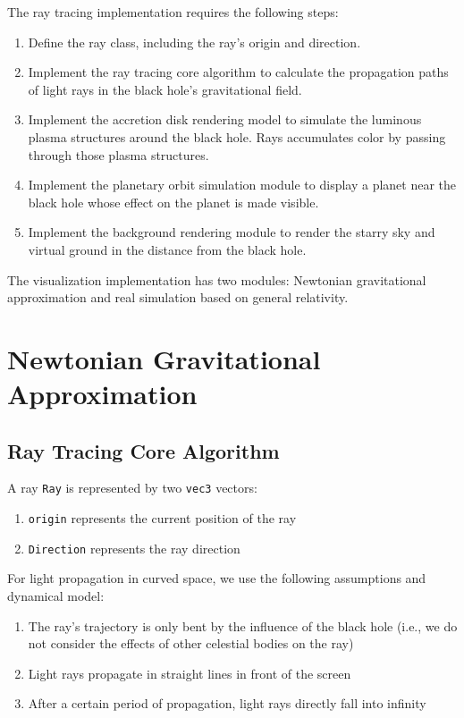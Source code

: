 \documentclass[11pt,a4paper]{article}
\begin{document}
The ray tracing implementation requires the following steps:
\begin{enumerate}
    \item Define the ray class, including the ray's origin and direction.
    \item Implement the ray tracing core algorithm to calculate the propagation paths of light rays in the black hole's gravitational field.
    \item Implement the accretion disk rendering model to simulate the luminous plasma structures around the black hole. Rays accumulates color by passing through those plasma structures.
    \item Implement the planetary orbit simulation module to display a planet near the black hole whose effect on the planet is made visible.
    \item Implement the background rendering module to render the starry sky and virtual ground in the distance from the black hole.
\end{enumerate}

The visualization implementation has two modules: Newtonian gravitational approximation and real simulation based on general relativity.

\section{Newtonian Gravitational Approximation}

\subsection{Ray Tracing Core Algorithm}

A ray \texttt{Ray} is represented by two \texttt{vec3} vectors:

\begin{enumerate}
    \item \texttt{origin} represents the current position of the ray
    \item \texttt{Direction} represents the ray direction
\end{enumerate}

For light propagation in curved space, we use the following assumptions and dynamical model:

\begin{enumerate}
    \item The ray's trajectory is only bent by the influence of the black hole (i.e., we do not consider the effects of other celestial bodies on the ray)
    \item Light rays propagate in straight lines in front of the screen
    \item After a certain period of propagation, light rays directly fall into infinity
\end{enumerate}
\end{document}
